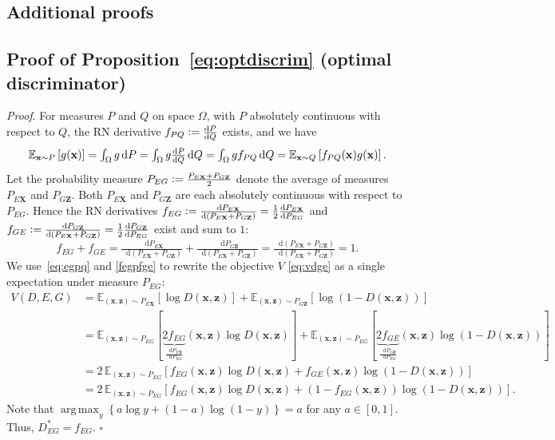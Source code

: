\documentclass{article}
\newcommand{\proof}{\textit{Proof}.\xspace}
\newcommand{\expect}[2]{\mathbb{E}_{#1}\left[#2\right]}
\newcommand{\logp}[1]{\log\left(#1\right)}
\newcommand{\defeq}{\vcentcolon=}
\renewcommand{\d}{\mathop{}\!\mathrm{d}}
\def\smallint{\begingroup\textstyle \int\endgroup}
\renewcommand{\vec}[1]{\mathbf{#1}}
\newcommand{\x}{\vec{x}}
\newcommand{\X}{\vec{X}}
\newcommand{\z}{\vec{z}}
\newcommand{\Z}{\vec{Z}}
\DeclareMathOperator*{\argmax}{arg\,max}
\newcommand{\lblsec}[1]{\label{sec:#1}}
\begin{document}
\newpage



\newpage
\begin{appendices}
\section{Additional proofs}
\subsection{Proof of Proposition~\ref{eq:optdiscrim} (optimal discriminator)}
\lblsec{optdiscrim}
\optdiscrim*
\proof
For measures $P$ and $Q$ on space $\Omega$, with $P$ absolutely continuous with respect to $Q$,
the RN derivative $
f_{PQ} \defeq \tfrac{\d P}{\d Q}
$ exists, and we have
\begin{equation}
\expect{\x \sim P}{
  g(\x)
}
=
\smallint_{\Omega}
  g \d P
=
\smallint_{\Omega}
  g
  \tfrac{\d P}{\d Q}
  \d Q
=
\smallint_{\Omega}
  g
  f_{PQ}
  \d Q
=
\expect{\x \sim Q}{
  f_{PQ}(\x)
  g(\x)
}.
\label{eq:egpq}
\end{equation}
Let the probability measure $
P_{EG} \defeq
\tfrac{P_{E\X} + P_{G\Z}}{2}
$ denote the average of measures $P_{E\X}$ and $P_{G\Z}$.
Both $P_{E\X}$ and $P_{G\Z}$ are each absolutely continuous with respect to $P_{EG}$.
Hence the RN derivatives $
f_{EG} \defeq \tfrac{\d P_{E\X}}{\d (P_{E\X} + P_{G\Z})}
= \tfrac{1}{2} \tfrac{\d P_{E\X}}{\d P_{EG}}
$ and $
f_{GE} \defeq \tfrac{\d P_{G\Z}}{\d (P_{E\X} + P_{G\Z})}
= \tfrac{1}{2} \tfrac{\d P_{G\Z}}{\d P_{EG}}
$ exist and sum to $1$:
\begin{equation}
f_{EG} + f_{GE}
=
\tfrac{\d P_{E\X}}{\d (P_{E\X} + P_{G\Z})} +
\tfrac{\d P_{G\Z}}{\d (P_{E\X} + P_{G\Z})}
= \tfrac{\d (P_{E\X} + P_{G\Z})}{\d (P_{E\X} + P_{G\Z})}
= 1.
\label{fegpfge}
\end{equation}
We use~\eqref{eq:egpq} and \eqref{fegpfge} to rewrite the objective $V$ \eqref{eq:vdge} as a single expectation under measure $P_{EG}$:
\begin{align}
\nonumber
V(D, E, G)
&=
\expect{(\x, \z) \sim P_{E\X}}{
  \log D(\x, \z)
}
+
\expect{(\x, \z) \sim P_{G\Z}}{
  \logp{ 1 - D(\x, \z) }
}
\\ \nonumber
&=
\mathbb{E}_{(\x, \z) \sim P_{EG}}[
  \underbrace{2 f_{EG}}_{
    \tfrac{\d P_{E\X}}{\d P_{EG}}
  }(\x, \z)
  \log D(\x, \z)
]
+
\mathbb{E}_{(\x, \z) \sim P_{EG}}[
  \underbrace{2 f_{GE}}_{
    \tfrac{\d P_{G\Z}}{\d P_{EG}}
  }(\x, \z)
  \logp{ 1 - D(\x, \z) }
]
\\ \nonumber
&=
2 \,
\expect{(\x, \z) \sim P_{EG}}{
  f_{EG}(\x, \z)
  \log D(\x, \z)
+
  f_{GE}(\x, \z)
  \logp{ 1 - D(\x, \z) }
}
\\ \nonumber
&=
2 \,
\expect{(\x, \z) \sim P_{EG}}{
  f_{EG}(\x, \z)
  \log D(\x, \z)
+
  (1-f_{EG}(\x, \z))
  \logp{ 1 - D(\x, \z) }
}.
\end{align}
Note that $
\argmax_y
\left\{
a \log y + (1-a) \log (1-y)
\right\}
=
a
$ for any $
a \in [0,1]
$.
Thus, $D^*_{EG}=f_{EG}$.
$\square$


\end{appendices}
\end{document}
